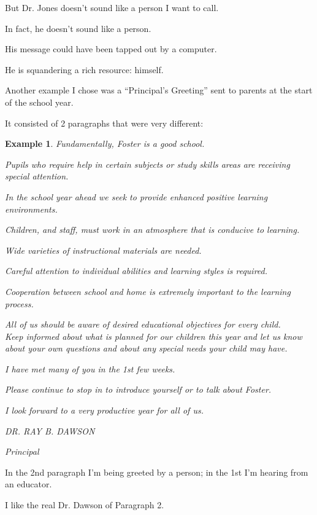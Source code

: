 \documentclass{book}
\numberwithin{equation}{section}
\newtheorem{example}{Example}[chapter]
\begin{document}
But Dr. Jones doesn't sound like a person I want to call.

In fact, he doesn't sound like a person.

His message could have been tapped out by a computer.

He is squandering a rich resource: himself.

%
Another example I chose was a ``Principal's Greeting'' sent to parents at the start of the school year.

It consisted of 2 paragraphs that were very different:
\begin{example}
    Fundamentally, Foster is a good school.
    
    Pupils who require help in certain subjects or study skills areas are receiving special attention.
    
    In the school year ahead we seek to provide enhanced positive learning environments.
    
    Children, and staff, must work in an atmosphere that is conducive to learning.
    
    Wide varieties of instructional materials are needed.
    
    Careful attention to individual abilities and learning styles is required.
    
    Cooperation between school and home is extremely important to the learning process.
    
    All of us should be aware of desired educational objectives for every child.
    \\
    
    Keep informed about what is planned for our children this year and let us know about your own questions and about any special needs your child may have.
    
    I have met many of you in the 1st few weeks.
    
    Please continue to stop in to introduce yourself or to talk about Foster.
    
    I look forward to a very productive year for all of us.
    
    \begin{flushright}
        DR. RAY B. DAWSON
        
        Principal
    \end{flushright}
\end{example}
In the 2nd paragraph I'm being greeted by a person; in the 1st I'm hearing from an educator.

I like the real Dr. Dawson of Paragraph 2.
\end{document}
